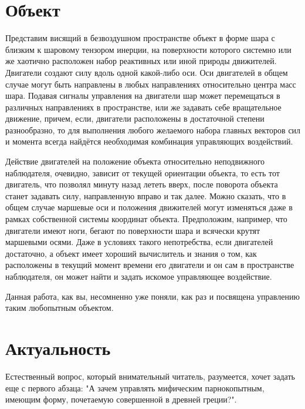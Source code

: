 \documentclass[a4paper]{article}
\begin{document}

\section{Объект}
Представим висящий в безвоздушном пространстве объект в форме шара с близким к шаровому тензором инерции, на поверхности которого системно или же хаотично расположен набор реактивных или иной природы движителей. Двигатели создают силу вдоль одной какой-либо оси. Оси двигателей в общем случае могут быть направлены в любых направлениях относительно центра масс шара. Подавая сигналы управления на двигатели шар может перемещаться в различных направлениях в пространстве, или же задавать себе вращательное движение, причем, если, двигатели расположены в достаточной степени разнообразно, то для выполнения любого желаемого набора главных векторов сил и момента всегда найдётся необходимая комбинация управляющих воздействий.

Действие двигателей на положение объекта относительно неподвижного наблюдателя, очевидно, зависит от текущей ориентации объекта, то есть тот двигатель, что позволял минуту назад лететь вверх, после поворота объекта станет задавать силу, направленную вправо и так далее. Можно сказать, что в общем случае маршевые оси и положения движителей могут изменяться даже в рамках собственной системы координат объекта. Предположим, например, что двигатели имеют ноги, бегают по поверхности шара и всячески крутят маршевыми осями. Даже в условиях такого непотребства, если двигателей достаточно, а объект имеет хороший вычислитель и знания о том, как расположены в текущий момент времени его двигатели и он сам в пространстве наблюдателя, он может найти и задать искомое управляющее воздействие.

Данная работа, как вы, несомненно уже поняли, как раз и посвящена управлению таким любопытным объектом.

\section{Актуальность}
Естественный вопрос, который внимательный читатель, разумеется, хочет задать еще с первого абзаца: "А зачем управлять мифическим парнокопытным, имеющим форму, почетаемую совершенной в древней греции?".
\end{document}
